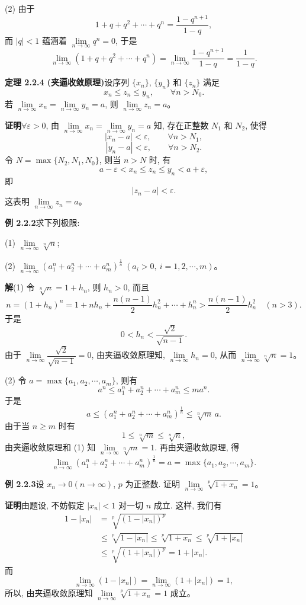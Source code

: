 \documentclass[UTF8,12pt,a4paper,fontset=fandol]{ctexart}
\begin{document}
(2) 由于
\[
  1+q+q^2+\cdots+q^n=\frac{1-q^{n+1}}{1-q},
\]
而 $|q|<1$ 蕴涵着 $\lim\limits_{n\to\infty}q^n=0$, 于是
\[
  \lim_{n\to\infty}(1+q+q^2+\cdots+q^n)
  =
  \lim_{n\to\infty}\frac{1-q^{n+1}}{1-q}
  =
  \frac1{1-q}.
\]

\noindent\textbf{定理 2.2.4 (夹逼收敛原理)}\quad 设序列 $\{x_n\}$, $\{y_n\}$ 和 $\{z_n\}$ 满足
\[
  x_n\leqslant z_n\leqslant y_n,\qquad \forall n>N_0.
\]
若 $\lim\limits_{n\to\infty}x_n=\lim\limits_{n\to\infty}y_n=a$, 则 $\lim\limits_{n\to\infty}z_n=a$。

\noindent\textbf{证明}\quad $\forall\varepsilon>0$, 由 $\lim\limits_{n\to\infty}x_n=\lim\limits_{n\to\infty}y_n=a$ 知, 存在正整数 $N_1$ 和 $N_2$, 使得
\[
  |x_n-a|<\varepsilon,\qquad \forall n>N_1,
\]
\[
  |y_n-a|<\varepsilon,\qquad \forall n>N_2.
\]
令 $N=\max\{N_2,N_1,N_0\}$, 则当 $n>N$ 时, 有
\[
  a-\varepsilon<x_n\leqslant z_n\leqslant y_n<a+\varepsilon,
\]
即
\[
  |z_n-a|<\varepsilon.
\]
这表明 $\lim\limits_{n\to\infty}z_n=a$。

\noindent\textbf{例 2.2.2}\quad 求下列极限:

(1) $\lim\limits_{n\to\infty}\sqrt[n]{n}$;

(2) $\lim\limits_{n\to\infty}(a_1^n+a_2^n+\cdots+a_m^n)^{\frac1n}\ (a_i>0,\ i=1,2,\cdots,m)$。

\noindent\textbf{解}\quad (1) 令 $\sqrt[n]{n}=1+h_n$, 则 $h_n>0$, 而且
\[
  n=(1+h_n)^n
  =
  1+nh_n+\frac{n(n-1)}2h_n^2+\cdots+h_n^n
  >
  \frac{n(n-1)}2h_n^2\quad(n>3).
\]
于是
\[
  0<h_n<\frac{\sqrt2}{\sqrt{n-1}}.
\]
由于 $\lim\limits_{n\to\infty}\dfrac{\sqrt2}{\sqrt{n-1}}=0$, 由夹逼收敛原理知, $\lim\limits_{n\to\infty}h_n=0$, 从而 $\lim\limits_{n\to\infty}\sqrt[n]{n}=1$。

(2) 令 $a=\max\{a_1,a_2,\cdots,a_m\}$, 则有
\[
  a^n\leqslant a_1^n+a_2^n+\cdots+a_m^n\leqslant ma^n.
\]
于是
\[
  a\leqslant (a_1^n+a_2^n+\cdots+a_m^n)^{\frac1n}\leqslant \sqrt[n]{m}\,a.
\]
由于当 $n\geqslant m$ 时有
\[
  1\leqslant\sqrt[n]{m}\leqslant\sqrt[n]{n},
\]
由夹逼收敛原理和 (1) 知 $\lim\limits_{n\to\infty}\sqrt[n]{m}=1$. 再由夹逼收敛原理, 得
\[
  \lim_{n\to\infty}(a_1^n+a_2^n+\cdots+a_m^n)^{\frac1n}
  =
  a
  =
  \max\{a_1,a_2,\cdots,a_m\}.
\]

\noindent\textbf{例 2.2.3}\quad 设 $x_n\to0(n\to\infty)$, $p$ 为正整数. 证明 $\lim\limits_{n\to\infty}\sqrt[p]{1+x_n}=1$。

\noindent\textbf{证明}\quad 由题设, 不妨假定 $|x_n|<1$ 对一切 $n$ 成立. 这样, 我们有
\[
\begin{aligned}
  1-|x_n|
  &=\sqrt[p]{(1-|x_n|)^p}\\
  &\leqslant \sqrt[p]{1-|x_n|}
   \leqslant \sqrt[p]{1+x_n}
   \leqslant \sqrt[p]{1+|x_n|}\\
  &\leqslant \sqrt[p]{(1+|x_n|)^p}
  =1+|x_n|.
\end{aligned}
\]
而
\[
  \lim_{n\to\infty}(1-|x_n|)
  =
  \lim_{n\to\infty}(1+|x_n|)
  =
  1,
\]
所以, 由夹逼收敛原理知 $\lim\limits_{n\to\infty}\sqrt[p]{1+x_n}=1$ 成立。
\end{document}
